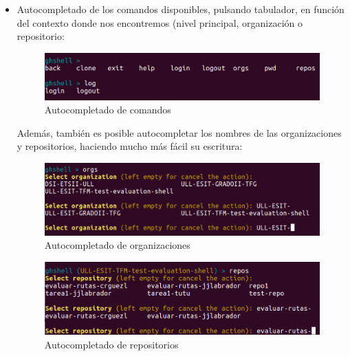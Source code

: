 \begin{itemize}
	\item Autocompletado de los comandos disponibles, pulsando tabulador, en función del contexto donde nos encontremos (nivel principal, organización o repositorio:
	
		\begin{figure}[H]
		\begin{center}
		\includegraphics[width=1\textwidth]{images/tab1-1}
		\caption{Autocompletado de comandos}
		\label{fig:tab1-1}
		\end{center}
		\end{figure}
	
	
	Además, también es posible autocompletar los nombres de las organizaciones y repositorios, haciendo mucho más fácil su escritura:
	
		\begin{figure}[H]
		\begin{center}
		\includegraphics[width=1\textwidth]{images/tab1-2}
		\caption{Autocompletado de organizaciones}
		\label{fig:tab1-1}
		\end{center}
		\end{figure}
		
		\begin{figure}[H]
		\begin{center}
		\includegraphics[width=1\textwidth]{images/tab1-3}
		\caption{Autocompletado de repositorios}
		\label{fig:tab1-1}
		\end{center}
		\end{figure}
	

\end{itemize}
